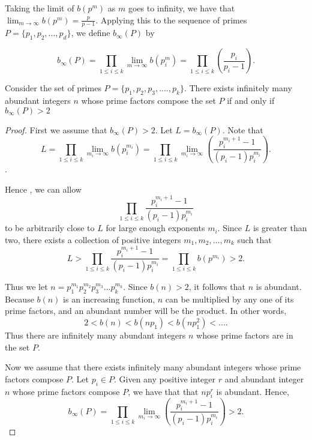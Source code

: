 \documentclass[../paper.tex]{article}
\begin{document}
Taking the limit of $b(p^m)$ as $m$ goes to infinity, we have that
$\lim_{m \rightarrow \infty}b(p^m) = \frac{p}{p-1}$.
Applying this to the sequence of primes $P = \{p_1, p_2, ..., p_d\}$,
we define $b_{\infty}(P)$ by

\begin{equation}\label{b_inf_def}
  b_{\infty}(P) 
  = \prod_{1 \leq i \leq k} \lim_{m \rightarrow \infty}b(p_i^m)
                = \prod_{1 \leq i \leq k}(\frac{p_i}{p_i - 1}) .
\end{equation}

\begin{theorem}\label{b_inf_1}
Consider the set of primes 
%
$P = \{p_{1}, p_{2}, p_{3}, .... , p_{k}\}$.
%
There exists infinitely many abundant integers $n$ whose prime 
factors compose the set $P$  if and only if $b_{\infty}(P) > 2$

\end{theorem}

\begin{proof}

First we assume that $b_{\infty}(P) > 2$. Let $L = b_\infty(P)$. 
Note that
%  
$$L 
%
= \prod_{1 \leq i \leq k} \lim_{m_i \rightarrow \infty}b(p_i^{m_i}) 
%
= \prod_{1 \leq i \leq k} \lim_{m_i \rightarrow \infty} 
%
( \frac{p_i^{m_{i} + 1} -1}{(p_i -1)p_{i}^{m_{i}}}) .$$.

Hence , we can allow
$$\prod_{1 \leq i \leq k} \frac{p_i^{m_{i} + 1} -1}
{(p_i -1)p_{i}^{m_{i}}}$$ 
to be arbitrarily close to $L$ for large 
enough exponents $m_i$. Since $L$ is greater than two, there exists a
collection of positive integers $m_1, m_2, ... , m_k$ such that 
% 
$$L > \prod_{1 \leq i \leq k} \frac{p_i^{m_{i} + 1} -1}
{(p_i -1)p_{i}^{m_{i}}} = \prod_{1 \leq i \leq k} b(p^{m_i}) > 2 .$$
%

Thus we let $n=p_1^{m_1}p_2^{m_2}p_3^{m_3}...p_{k}^{m_k}$. 
Since $b(n) > 2$, it follows that $n$ is abundant. 
Because $b(n)$ is an increasing function, $n$ can be multiplied
by any one of its prime factors, and an abundant number 
will be the product. In other words,
%
$$2 < b(n) < b(np_1) < b(np_1^2) < ... .$$
%
Thus there are infinitely many abundant integers $n$ whose prime
factors are in the set $P$.

Now we assume that there exists infinitely many abundant integers 
 whose prime factors compose $P$. Let $p_i \in P$. Given any
positive integer $r$ and abundant integer $n$ whose prime factors 
compose $P$, we have that that $np_i^r$ is abundant. Hence,
%
$$ b_\infty(P) = \prod_{1 \leq i \leq k} \lim_{m_i \rightarrow 
\infty} ( \frac{p_i^{m_{i} + 1} -1}{(p_i -1)p_{i}^{m_{i}}}) > 2 .$$

\end{proof}
\end{document}
